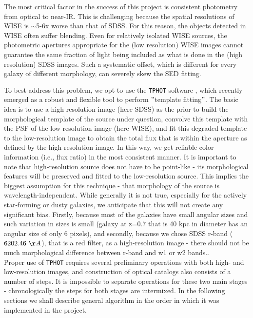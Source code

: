	
	The most critical factor in the success of this project is consistent photometry from optical to near-IR. This is challenging because the spatial resolutions of WISE is $\sim$5-6x worse than that of SDSS. For this reason, the objects detected in WISE often suffer blending. Even for relatively isolated WISE sources, the photometric apertures appropriate for the (low resolution) WISE images cannot guarantee the same fraction of light being included as what is done in the (high resolution) SDSS images. Such a systematic offset, which is different for every galaxy of different morphology, can severely skew the SED fitting.

To best address this problem, we opt to use the {\tt TPHOT} software \citep{Merlin2016a}, which recently emerged as a robust and flexible tool to perform $"$template fitting$"$. The basic idea is to use a high-resolution image (here SDSS) as the prior to build the morphological template of the source under question, convolve this template with the PSF of the low-resolution image (here WISE), and fit this degraded template to the low-resolution image to obtain the total flux that is within the aperture as defined by the high-resolution image. In this way, we get reliable color information (i.e., flux ratio) in the most consistent manner. It is important to note that high-resolution source does not have to be point-like - its morphological features will be preserved and fitted to the low-resolution source. This implies the biggest assumption for this technique - that morphology of the source is wavelength-independent. While generally it is not true, especially for the actively star-forming or dusty galaxies, we anticipate that this will not create any significant bias. Firstly, because most of the galaxies have small angular sizes and such variation in sizes is small (galaxy at z=0.7 that is 40 kpc in diameter has an angular size of only 6 pixels), and secondly, because we chose SDSS r-band ($6202.46~\AA$), that is a red filter, as a high-resolution image - there should not be much morphological difference between r-band and w1 or w2 bands..\\

Proper use of {\tt TPHOT} requires several preliminary operations with both high- and low-resolution images, and construction of optical catalogs also consists of a number of steps. It is impossible to separate operations for these two main stages - chronologically the steps for both stages are intermixed. In the following sections we shall describe general algorithm in the order in which it was implemented in the project.

